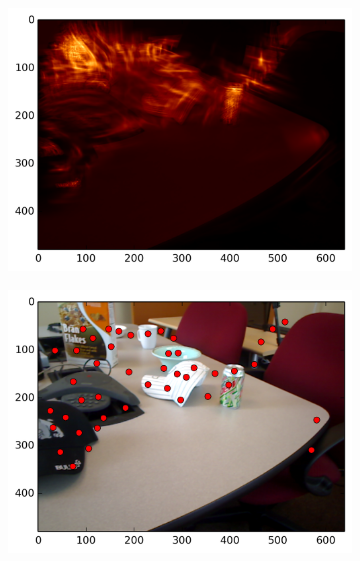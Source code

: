 \begin{figure}[ht]
\begin{subfigure}[]{0.25\linewidth}\label{fig:meet_smag_3}\includegraphics[width=\linewidth]{figures/meeting_smag_7}\end{subfigure}%
\begin{subfigure}[]{0.25\linewidth}\label{fig:meet_feats_3}\includegraphics[width=\linewidth]{figures/meeting_feats_7}\end{subfigure}\\

\end{figure}
